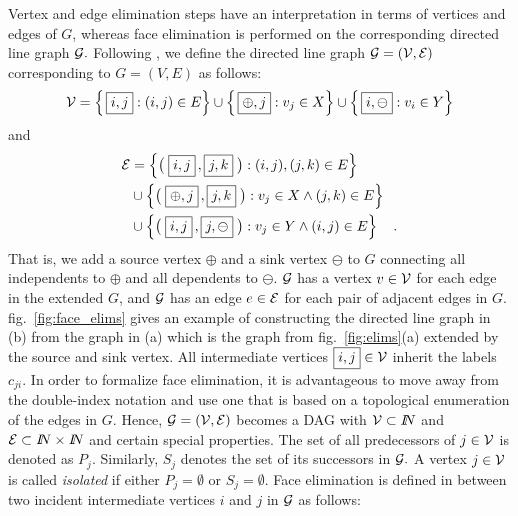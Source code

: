 \documentclass{book}
\newcommand{\reffig}[1]{{fig.~\ref{#1}}}
\begin{document}
Vertex and edge elimination steps have an 
interpretation in terms of vertices and edges
of $G$, whereas face elimination is performed on 
the corresponding directed line graph $\cal G.$
Following \cite{Naumann2004OAo}, we define the directed line graph $\cal G=(V,E)$ 
corresponding to $G=(V,E)$ as follows:
\[
{\cal V}=
\left\{\,\framebox{$i,j$}      :(i,j)\in E \right\} \cup 
\left\{\,\framebox{$\oplus,j$} :v_j  \in X \right\} \cup 
\left\{\,\framebox{$i,\ominus$}:v_i  \in Y \right\}
\] 
and 
\begin{align*}
  {\cal E}
  &=    \left\{\big(\;\framebox{$i,j$}     \,,\framebox{$j,k$}      \;\big): (i,j),(j,k) \in E        \right\} \\
  &\cup \left\{\big(\;\framebox{$\oplus,j$}\,,\framebox{$j,k$}      \;\big): v_j\in X \land (j,k)\in E\right\} \\
  &\cup \left\{\big(\;\framebox{$i,j$}     \,,\framebox{$j,\ominus$}\;\big): v_j\in Y \land (i,j)\in E\right\} 
  \quad . \\
\end{align*}
That is, 
we add a source vertex $\oplus$ and a sink vertex 
$\ominus$ to $G$ connecting all independents to $\oplus$
and all dependents to $\ominus$. $\cal G$ has   
a vertex $ v \in \cal V$ for each edge in the extended $G$, 
and $\cal G$ has an edge $ e \in \cal E$ for each 
pair of adjacent edges in $G$. \reffig{fig:face_elims} gives an 
example of constructing the directed line graph in (b) from the graph in (a) 
which is the graph from \reffig{fig:elims}(a) extended by the source and sink vertex.   
All intermediate vertices $\framebox{$i,j$} \in \cal V$ inherit the labels  
$c_{ji}$. In order to formalize face elimination, it is advantageous to move away
from the double-index notation and use one that is based on a topological
enumeration of the edges in $G.$ Hence, ${\cal G}=({\cal V}, {\cal E})$ 
becomes a DAG with ${\cal V} \subset I\!\!N$ and
${\cal E} \subset I\!\!N \times I\!\!N$ and
certain special properties.
The set of all predecessors of $j \in {\cal V}$ is denoted as $P_j.$ 
Similarly, $S_j$ denotes the set of its successors in $\cal G.$ 
A vertex 
$j \in \cal V$ is called {\em isolated} if either 
$P_j=\emptyset$ or
$S_j=\emptyset.$ 
Face elimination is defined in \cite{Naumann2004OAo}
between two incident intermediate vertices $i$ and $j$ in $\cal G$ as follows:
\end{document}
